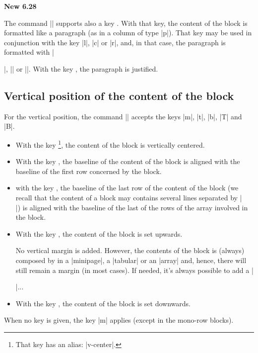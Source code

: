 \documentclass[dvipsnames]{article}%
\begin{document}
\bigskip
\colorbox{yellow!50}{\bfseries New 6.28}\par\nobreak

\smallskip
The command |\Block| supports also a key . With that key, the
content of the block is formatted like a paragraph (as in a column of type |p|).
That key may be used in conjunction with the key |l|, |c| or |r|, and, in that
case, the paragraph is formatted with |\raggedright|, |\centering| or
|\raggedleft|. With the key , the paragraph is justified.

\subsection{Vertical position of the content of the block}

\label{vertical-pos-block}

For the vertical position, the command |\Blocks| accepts the keys
|m|, |t|, |b|, |T| and |B|.


\begin{itemize}
\item {}
With the key \footnote{That key has an alias: |v-center|.}, the content of the block is vertically centered.
\item With the key , the baseline of the content of the block is aligned
with the baseline of the first row concerned by the block.
\item with the key , the baseline of the last row of the content of the
block (we recall that the content of a block may contains several lines
separated by |\\|) is aligned with the baseline of the last of the rows of the
array involved in the block.
\item With the key , the content of the block is set upwards. 

No vertical margin is added. However, the contents of the block is (always)
composed by  in a |{minipage}|, a |{tabular}| or an |{array}|
and, hence, there will still remain a margin (in most cases). If needed, it's
always possible to add a |\strut|...

\item With the key , the content of the block is set downwards.
\end{itemize}

When no key is given, the key |m| applies (except in the mono-row blocks).
\end{document}
